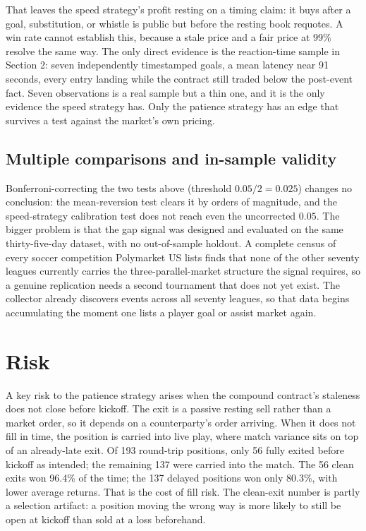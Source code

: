 \documentclass[12pt]{article}
\begin{document}
That leaves the speed strategy's profit resting on a timing claim: it buys after
a goal, substitution, or whistle is public but before the resting book requotes.
A win rate cannot establish this, because a stale price and a fair price at 99\%
resolve the same way. The only direct evidence is the reaction-time sample in
Section 2: seven independently timestamped goals, a mean latency near 91 seconds,
every entry landing while the contract still traded below the post-event fact.
Seven observations is a real sample but a thin one, and it is the only evidence
the speed strategy has. Only the patience strategy has an edge that survives a
test against the market's own pricing.

\subsection{Multiple comparisons and in-sample validity}

Bonferroni-correcting the two tests above (threshold $0.05 / 2 = 0.025$)
changes no conclusion: the mean-reversion test clears it by orders of magnitude,
and the speed-strategy calibration test does not reach even the uncorrected
$0.05$. The bigger problem is that the gap signal was designed and evaluated on
the same thirty-five-day dataset, with no out-of-sample holdout. A complete census of every soccer
competition Polymarket US lists finds that none of the other seventy leagues
currently carries the three-parallel-market structure the signal requires, so a
genuine replication needs a second tournament that does not yet exist. The
collector already discovers events across all seventy leagues, so that data
begins accumulating the moment one lists a player goal or assist market again.

\section{Risk}

A key risk to the patience strategy arises when the compound contract's staleness
does not close before kickoff. The exit is a passive resting sell rather than a
market order, so it depends on a counterparty's order arriving. When it does not
fill in time, the position is carried into live play, where match variance sits
on top of an already-late exit. Of 193 round-trip positions, only 56 fully
exited before kickoff as intended; the remaining 137 were carried into the match.
The 56 clean exits won 96.4\% of the time; the 137 delayed positions won only
80.3\%, with lower average returns. That is the cost of fill risk. The clean-exit
number is partly a selection artifact: a position moving the wrong way is more
likely to still be open at kickoff than sold at a loss beforehand.
\end{document}
